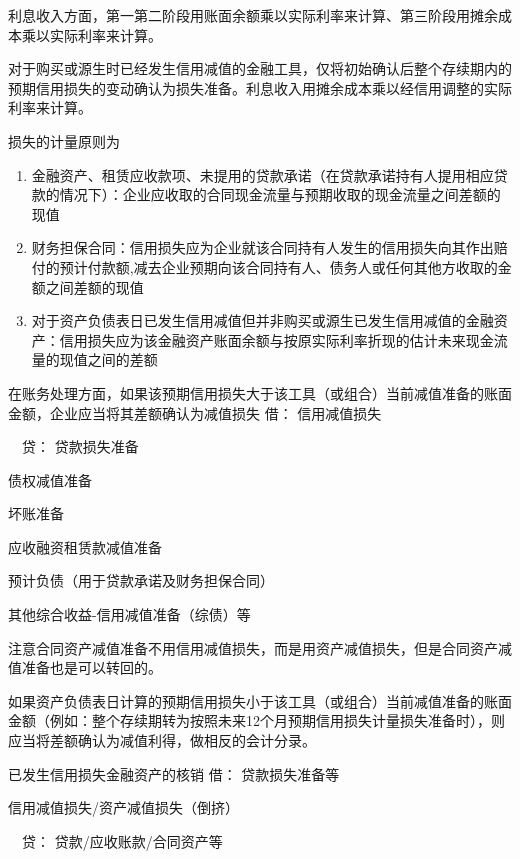 \documentclass[UTF8,12pt]{ctexart}
\newenvironment{Dr}{\noindent 借：}{\par}
\newenvironment{Cr}{\noindent \ \ 贷：}{\par}
\numberwithin{equation}{section} %
\numberwithin{figure}{section}
\numberwithin{table}{section}
\begin{document}
	利息收入方面，第一第二阶段用账面余额乘以实际利率来计算、第三阶段用摊余成本乘以实际利率来计算。
	
	对于购买或源生时已经发生信用减值的金融工具，仅将初始确认后整个存续期内的预期信用损失的变动确认为损失准备。利息收入用摊余成本乘以经信用调整的实际利率来计算。
	
	损失的计量原则为
	\begin{enumerate}
		\item 金融资产、租赁应收款项、未提用的贷款承诺（在贷款承诺持有人提用相应贷款的情况下）：企业应收取的合同现金流量与预期收取的现金流量之间差额的现值
		
		\item 财务担保合同：信用损失应为企业就该合同持有人发生的信用损失向其作出赔付的预计付款额,减去企业预期向该合同持有人、债务人或任何其他方收取的金额之间差额的现值
		
		\item 对于资产负债表日已发生信用减值但并非购买或源生已发生信用减值的金融资产：信用损失应为该金融资产账面余额与按原实际利率折现的估计未来现金流量的现值之间的差额
		
	\end{enumerate}

	在账务处理方面，如果该预期信用损失大于该工具（或组合）当前减值准备的账面金额，企业应当将其差额确认为减值损失
	\begin{Dr}
		信用减值损失
	\end{Dr}
	\begin{Cr}
		贷款损失准备
		
		债权减值准备
		
		坏账准备
		
		应收融资租赁款减值准备
		
		预计负债（用于贷款承诺及财务担保合同）
		
		其他综合收益-信用减值准备（综债）等
	\end{Cr}

	注意合同资产减值准备不用信用减值损失，而是用资产减值损失，但是合同资产减值准备也是可以转回的。
	
	如果资产负债表日计算的预期信用损失小于该工具（或组合）当前减值准备的账面金额（例如：整个存续期转为按照未来12个月预期信用损失计量损失准备时），则应当将差额确认为减值利得，做相反的会计分录。
	
	已发生信用损失金融资产的核销
	\begin{Dr}
		贷款损失准备等
		
		信用减值损失/资产减值损失（倒挤）
	\end{Dr}
	\begin{Cr}
		贷款/应收账款/合同资产等
	\end{Cr}
	
\end{document}
